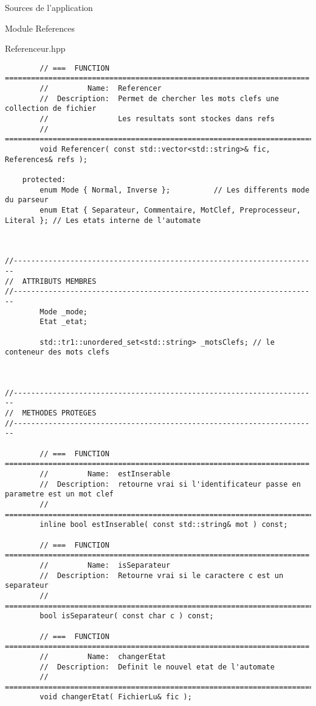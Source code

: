 \documentclass{article}
\begin{document}
\begin{section}{Sources de l'application}
\begin{subsection}{Module References}
\begin{paragraph}{Referenceur.hpp}
\begin{verbatim}
        // ===  FUNCTION  ======================================================================
        //         Name:  Referencer
        //  Description:  Permet de chercher les mots clefs une collection de fichier
        //                Les resultats sont stockes dans refs
        // =====================================================================================
        void Referencer( const std::vector<std::string>& fic, References& refs );

    protected:
        enum Mode { Normal, Inverse };          // Les differents mode du parseur
        enum Etat { Separateur, Commentaire, MotClef, Preprocesseur, Literal }; // Les etats interne de l'automate



//----------------------------------------------------------------------
//  ATTRIBUTS MEMBRES
//----------------------------------------------------------------------
        Mode _mode;
        Etat _etat;

        std::tr1::unordered_set<std::string> _motsClefs; // le conteneur des mots clefs



//----------------------------------------------------------------------
//  METHODES PROTEGES
//----------------------------------------------------------------------

        // ===  FUNCTION  ======================================================================
        //         Name:  estInserable
        //  Description:  retourne vrai si l'identificateur passe en parametre est un mot clef
        // =====================================================================================
        inline bool estInserable( const std::string& mot ) const;

        // ===  FUNCTION  ======================================================================
        //         Name:  isSeparateur
        //  Description:  Retourne vrai si le caractere c est un separateur
        // =====================================================================================
        bool isSeparateur( const char c ) const;

        // ===  FUNCTION  ======================================================================
        //         Name:  changerEtat
        //  Description:  Definit le nouvel etat de l'automate
        // =====================================================================================
        void changerEtat( FichierLu& fic );


\end{verbatim}
\end{paragraph}
\end{subsection}
\end{section}
\end{document}
